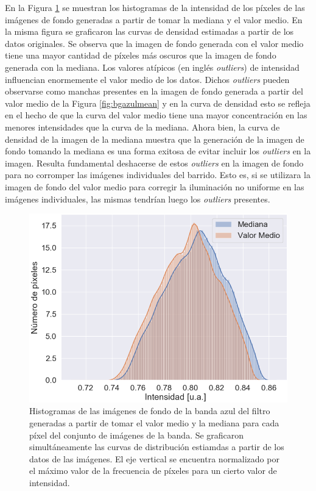 \hspace{0.5cm}En la Figura \ref{fig:comparhists} se muestran los histogramas de la intensidad de los píxeles de las imágenes de fondo generadas a partir de tomar la mediana y el valor medio. En la misma figura se graficaron las curvas de densidad estimadas a partir de los datos originales. Se observa que la imagen de fondo generada con el valor medio tiene una mayor cantidad de píxeles más oscuros que la imagen de fondo generada con la mediana. Los valores atípicos (en inglés \textit{outliers}) de intensidad influencian enormemente el valor medio de los datos. Dichos \textit{outliers} pueden observarse como manchas presentes en la imagen de fondo generada a partir del valor medio de la Figura \ref{fig:bgazulmean} y en la curva de densidad esto se refleja en el hecho de que la curva del valor medio tiene una mayor concentración en las menores intensidades que la curva de la mediana. Ahora bien, la curva de densidad de la imagen de la mediana muestra que la generación de la imagen de fondo tomando la mediana es una forma exitosa de evitar incluir los \textit{outliers} en la imagen. Resulta fundamental deshacerse de estos \textit{outliers} en la imagen de fondo para no corromper las imágenes individuales del barrido. Esto es, si se utilizara la imagen de fondo del valor medio para corregir la iluminación no uniforme en las imágenes individuales, las mismas tendrían luego los \textit{outliers} presentes.
\begin{figure}[H]
	\centering
\includegraphics[scale=1.0	]{Figs/defectosZEISS/comparhistsmedi.png}
\caption{Histogramas de las imágenes de fondo de la banda azul del filtro generadas a partir de tomar el valor medio y la mediana para cada píxel del conjunto de imágenes de la banda. Se graficaron simultáneamente las curvas de distribución estiamdas a partir de los datos de las imágenes. El eje vertical se encuentra normalizado por el máximo valor de la frecuencia de píxeles para un cierto valor de intensidad.}
\label{fig:comparhists}
\end{figure}	


